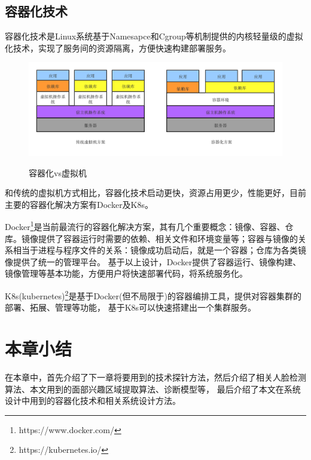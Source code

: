 \subsection{容器化技术}
容器化技术是Linux系统基于Namesapce和Cgroup等机制提供的内核轻量级的虚拟化技术，实现了服务间的资源隔离，方便快速构建部署服务。

\begin{figure}
    \centering
    \includegraphics[width=12cm]{images/container.png}
    \label{fig:container}
    \caption{容器化vs虚拟机}
\end{figure}

和传统的虚拟机方式相比，容器化技术启动更快，资源占用更少，性能更好，目前主要的容器化解决方案有Docker及K8s。

Docker\footnote{https://www.docker.com/}是当前最流行的容器化解决方案，其有几个重要概念：镜像、容器、仓库。镜像提供了容器运行时需要的依赖、相关文件和环境变量等；容器与镜像的关系相当于进程与程序文件的关系：镜像成功启动后，就是一个容器；仓库为各类镜像提供了统一的管理平台。
基于以上设计，Docker提供了容器运行、镜像构建、镜像管理等基本功能，方便用户将快速部署代码，将系统服务化。

K8s(kubernetes)\footnote{https://kubernetes.io/}是基于Docker(但不局限于)的容器编排工具，提供对容器集群的部署、拓展、管理等功能，
基于K8s可以快速搭建出一个集群服务。

\section{本章小结}
在本章中，首先介绍了下一章将要用到的技术探针方法，然后介绍了相关人脸检测算法、本文用到的面部兴趣区域提取算法、诊断模型等，
最后介绍了本文在系统设计中用到的容器化技术和相关系统设计方法。